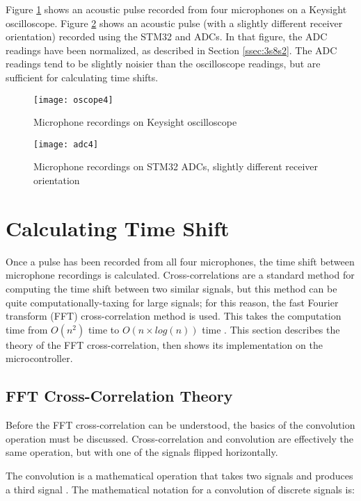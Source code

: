 \documentclass[12pt,a4paper]{report}
\begin{document}
Figure \ref{fig:oscope4} shows an acoustic pulse recorded from four microphones on a Keysight oscilloscope. Figure \ref{fig:adc4} shows an acoustic pulse (with a slightly different receiver orientation) recorded using the STM32 and ADCs. In that figure, the ADC readings have been normalized, as described in Section \ref{ssec:3s8s2}. The ADC readings tend to be slightly noisier than the oscilloscope readings, but are sufficient for calculating time shifts.

\begin{figure}[htbp]
\centering
\texttt{[image: oscope4]}
\caption{Microphone recordings on Keysight oscilloscope}
\label{fig:oscope4}
\end{figure}

\begin{figure}[htbp]
\centering
\texttt{[image: adc4]}
\caption{Microphone recordings on STM32 ADCs, slightly different receiver orientation}
\label{fig:adc4}
\end{figure}

\section{Calculating Time Shift} \label{sec:3s8}
Once a pulse has been recorded from all four microphones, the time shift between microphone recordings is calculated. Cross-correlations are a standard method for computing the time shift between two similar signals, but this method can be quite computationally-taxing  for large signals; for this reason, the fast Fourier transform (FFT) cross-correlation method is used. This takes the computation time from \(O(n^2)\) time to \(O(n \times log(n))\) time \cite{dspguide}. This section describes the theory of the FFT cross-correlation, then shows its implementation on the microcontroller.

\subsection{FFT Cross-Correlation Theory} \label{ssec:3s8s1}
Before the FFT cross-correlation can be understood, the basics of the convolution operation must be discussed. Cross-correlation and convolution are effectively the same operation, but with one of the signals flipped horizontally.

The convolution is a mathematical operation that takes two signals and produces a third signal \cite{dspguide}. The mathematical notation for a convolution of discrete signals is:
\end{document}
